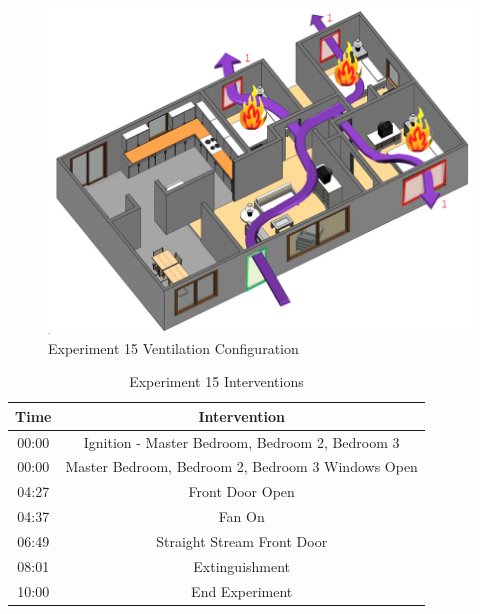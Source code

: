 \documentclass{article}
\begin{document}
\begin{figure}[H]
	\centering
	\includegraphics[width=5in]{0_Images/FireExperiments/Single_Story/Experiment_15.jpg}
	\caption{Experiment 15 Ventilation Configuration}
	\label{fig:Exp15VentConfig}
\end{figure}

\begin{table}[H]
	\centering
	\caption{Experiment 15 Interventions}
	\begin{tabular}{|c|c|} 
		\hline
		Time & Intervention \\ \hline \hline
		00:00 & Ignition - Master Bedroom, Bedroom 2, Bedroom 3 \\ \hline
		00:00 & Master Bedroom, Bedroom 2, Bedroom 3 Windows Open \\ \hline
		04:27 & Front Door Open \\ \hline
		04:37 & Fan On \\ \hline
		06:49 & Straight Stream Front Door \\ \hline
		08:01 & Extinguishment \\ \hline
		10:00 & End Experiment \\ \hline
	\end{tabular}
	\label{Table:Exp15Interventions}
\end{table}

\clearpage
\end{document}
